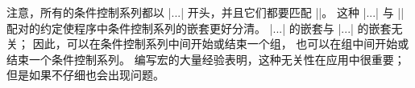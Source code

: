 {{{{{{{{%
\ddanger 注意，所有的条件控制系列都以 |\if...| 开头，并且它们都要匹配 |\fi|。%
这种 |\if...| 与 |\fi| 配对的约定使程序中条件控制系列的嵌套更好分清。%
|\if...\fi| 的嵌套与 |{...}| 的嵌套无关；
因此，可以在条件控制系列中间开始或结束一个组，
也可以在组中间开始或结束一个条件控制系列。%
编写宏的大量经验表明，这种无关性在应用中很重要；
但是如果不仔细也会出现问题。

}}}}}}}}
